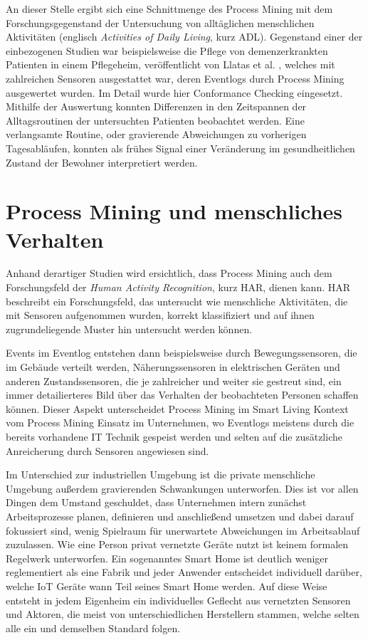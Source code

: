 An dieser Stelle ergibt sich eine Schnittmenge des Process Mining mit dem Forschungsgegenstand der Untersuchung von alltäglichen menschlichen Aktivitäten (englisch \textit{Activities of Daily Living}, kurz ADL). 
Gegenstand einer der einbezogenen Studien war beispielsweise die Pflege von demenzerkrankten Patienten in einem Pflegeheim, veröffentlicht von Llatas et al. \cite{llatas}, welches mit zahlreichen Sensoren ausgestattet war, deren Eventlogs durch Process Mining ausgewertet wurden. Im Detail wurde hier Conformance Checking eingesetzt. Mithilfe der Auswertung konnten  Differenzen in den Zeitspannen der Alltagsroutinen der untersuchten Patienten beobachtet werden. Eine verlangsamte Routine, oder gravierende Abweichungen zu vorherigen Tagesabläufen, konnten als frühes Signal einer Veränderung im gesundheitlichen Zustand der Bewohner interpretiert werden.

\section{Process Mining und menschliches Verhalten}\label{har}
Anhand derartiger Studien wird ersichtlich, dass Process Mining auch dem Forschungsfeld der \textit{Human Activity Recognition}, kurz HAR, dienen kann. HAR beschreibt ein Forschungsfeld, das untersucht wie menschliche Aktivitäten, die mit Sensoren aufgenommen wurden, korrekt klassifiziert und auf ihnen zugrundeliegende Muster hin untersucht werden können. 

Events im Eventlog entstehen dann beispielsweise durch Bewegungssensoren, die im Gebäude verteilt werden, Näherungssensoren in elektrischen Geräten und anderen Zustandssensoren, die je zahlreicher und weiter sie gestreut sind, ein immer detailierteres Bild über das Verhalten der beobachteten Personen schaffen können. 
Dieser Aspekt unterscheidet Process Mining im Smart Living Kontext vom Process Mining Einsatz im Unternehmen, wo Eventlogs meistens durch die bereits vorhandene IT Technik gespeist werden und selten auf die zusätzliche Anreicherung durch Sensoren angewiesen sind.
 
Im Unterschied zur industriellen Umgebung ist die private menschliche Umgebung außerdem gravierenden Schwankungen unterworfen. Dies ist vor allen Dingen dem Umstand geschuldet, dass Unternehmen intern zunächst Arbeitsprozesse planen, definieren und anschließend umsetzen und dabei darauf fokussiert sind, wenig Spielraum für unerwartete Abweichungen im Arbeitsablauf zuzulassen. 
Wie eine Person privat vernetzte Geräte nutzt ist keinem formalen Regelwerk unterworfen. Ein sogenanntes Smart Home ist deutlich weniger reglementiert als eine Fabrik und jeder Anwender entscheidet individuell darüber, welche IoT Geräte wann Teil seines Smart Home werden. Auf diese Weise entsteht in jedem Eigenheim ein individuelles Geflecht aus vernetzten Sensoren und Aktoren, die meist von unterschiedlichen Herstellern stammen, welche selten alle ein und demselben Standard folgen.


